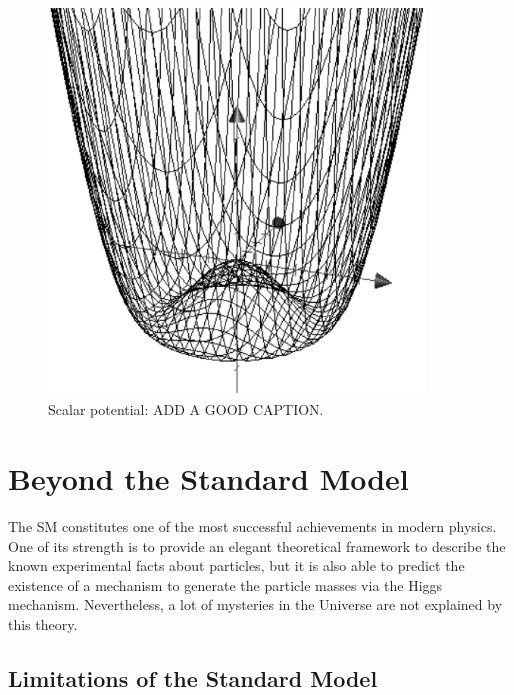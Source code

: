     \begin{figure}[h]
    \centering
      \includegraphics[width = 10cm]{Pictures/SM/mexHat.eps}
    \caption{Scalar potential: ADD A GOOD CAPTION.}
    \label{fig:scalarPotential}
    \end{figure}


  \section{Beyond the Standard Model}


  The \gls{SM} constitutes one of the most successful achievements in modern physics.
  One of its strength is to provide an elegant theoretical framework to describe the known experimental facts about particles, but it is also able to predict the existence of a mechanism to generate the particle masses via the Higgs mechanism.
  Nevertheless, a lot of mysteries in the Universe are not explained by this theory. 
  
  \subsection{Limitations of the Standard Model}

